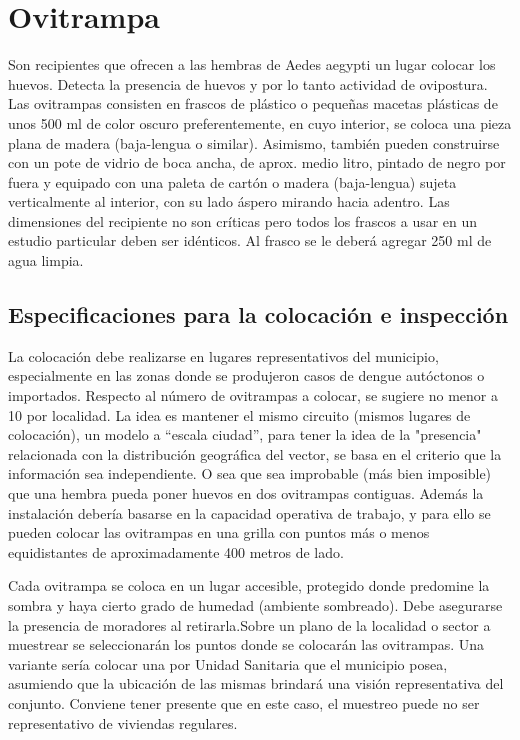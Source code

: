 \section{Ovitrampa}
\label{sec:densidad-vectorial-ovitrampa}
Son recipientes que ofrecen a las hembras de Aedes aegypti un lugar colocar
los huevos. Detecta la presencia de huevos y por lo tanto actividad de
ovipostura. Las ovitrampas consisten en frascos de plástico o pequeñas
macetas plásticas de unos 500 ml de color oscuro preferentemente, en cuyo
interior, se coloca una pieza plana de madera (baja-lengua o similar).
Asimismo, también pueden construirse con un pote de vidrio de boca ancha,
de aprox. medio litro, pintado de negro por fuera y equipado con una paleta
de cartón o madera (baja-lengua) sujeta verticalmente al interior, con su
lado áspero mirando hacia adentro. Las dimensiones del recipiente no son
críticas pero todos los frascos a usar en un estudio particular deben ser
idénticos. Al frasco se le deberá agregar 250 ml de agua limpia.


\subsection{Especificaciones para la colocación e inspección}
La colocación debe realizarse en lugares representativos del municipio,
especialmente en las zonas donde se produjeron casos de dengue autóctonos
o importados. Respecto al número de ovitrampas a colocar, se sugiere no
menor a 10 por localidad. La idea es mantener el mismo circuito (mismos
lugares de colocación), un modelo a “escala ciudad”, para tener la idea de
la "presencia" relacionada con la distribución geográfica del vector, se
basa en el criterio que la información sea independiente. O sea que sea
improbable (más bien imposible) que una hembra pueda poner huevos en dos
ovitrampas contiguas. Además la instalación debería basarse en la capacidad
operativa de trabajo, y para ello se pueden colocar las ovitrampas en una
grilla con puntos más o menos equidistantes de aproximadamente 400 metros
de lado.

Cada ovitrampa se coloca en un lugar accesible, protegido donde predomine
la sombra y haya cierto grado de humedad (ambiente sombreado). Debe asegurarse
la presencia de moradores al retirarla.Sobre un plano de la localidad o
sector a muestrear se seleccionarán los puntos donde se colocarán las
ovitrampas. Una variante sería colocar una por Unidad Sanitaria que el
municipio posea, asumiendo que la ubicación de las mismas brindará una
visión representativa del conjunto. Conviene tener presente que en este
caso, el muestreo puede no ser representativo de viviendas regulares.

